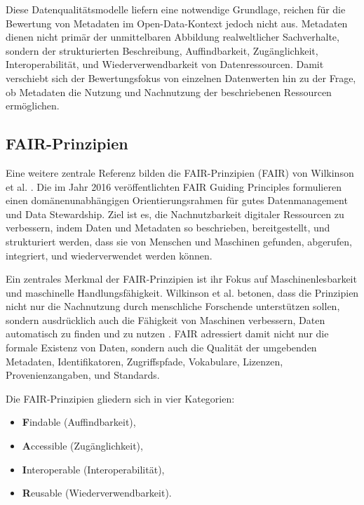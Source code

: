 Diese Datenqualitätsmodelle liefern eine notwendige Grundlage, reichen für die Bewertung von Metadaten im Open-Data-Kontext jedoch nicht aus. Metadaten dienen nicht primär der unmittelbaren Abbildung realweltlicher Sachverhalte, sondern der strukturierten Beschreibung, Auffindbarkeit, Zugänglichkeit, Interoperabilität, und Wiederverwendbarkeit von Datenressourcen. Damit verschiebt sich der Bewertungsfokus von einzelnen Datenwerten hin zu der Frage, ob Metadaten die Nutzung und Nachnutzung der beschriebenen Ressourcen ermöglichen.

\subsection{FAIR-Prinzipien}

Eine weitere zentrale Referenz bilden die FAIR-Prinzipien (\acrlong{FAIR}) von Wilkinson et al. \cite{wilkinson2016fair}. Die im Jahr 2016 veröffentlichten FAIR Guiding Principles formulieren einen domänenunabhängigen Orientierungsrahmen für gutes Datenmanagement und Data Stewardship. Ziel ist es, die Nachnutzbarkeit digitaler Ressourcen zu verbessern, indem Daten und Metadaten so beschrieben, bereitgestellt, und strukturiert werden, dass sie von Menschen und Maschinen gefunden, abgerufen, integriert, und wiederverwendet werden können. 

Ein zentrales Merkmal der FAIR-Prinzipien ist ihr Fokus auf Maschinenlesbarkeit und maschinelle Handlungsfähigkeit. Wilkinson et al. betonen, dass die Prinzipien nicht nur die Nachnutzung durch menschliche Forschende unterstützen sollen, sondern ausdrücklich auch die Fähigkeit von Maschinen verbessern, Daten automatisch zu finden und zu nutzen \cite{wilkinson2016fair}. FAIR adressiert damit nicht nur die formale Existenz von Daten, sondern auch die Qualität der umgebenden Metadaten, Identifikatoren, Zugriffspfade, Vokabulare, Lizenzen, Provenienzangaben, und Standards.

Die FAIR-Prinzipien gliedern sich in vier Kategorien:

\begin{itemize}
    \item \textbf{F}indable (Auffindbarkeit),
    \item \textbf{A}ccessible (Zugänglichkeit),
    \item \textbf{I}nteroperable (Interoperabilität),
    \item \textbf{R}eusable (Wiederverwendbarkeit).
\end{itemize}

